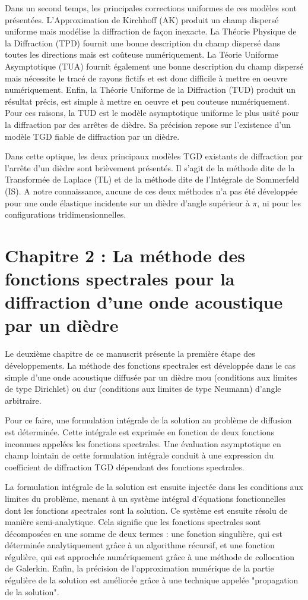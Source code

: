 Dans un second temps, les principales corrections uniformes de ces modèles sont présentées. L'Approximation de Kirchhoff (AK) produit un champ dispersé uniforme mais modélise la diffraction de façon inexacte. La Théorie Physique de la Diffraction (TPD) fournit une bonne description du champ dispersé dans toutes les directions mais est coûteuse numériquement. La Téorie Uniforme Asymptotique (TUA) fournit également une bonne description du champ dispersé mais nécessite le tracé de rayons fictifs et est donc difficile à mettre en oeuvre numériquement. Enfin, la Théorie Uniforme de la Diffraction (TUD) produit un résultat précis, est simple à mettre en oeuvre et peu couteuse numériquement. Pour ces raisons, la TUD est le modèle asymptotique uniforme le plus usité pour la diffraction par des arrêtes de dièdre. Sa précision repose sur l'existence d'un modèle TGD fiable de diffraction par un dièdre. 

Dans cette optique, les deux principaux modèles TGD existants de diffraction par l'arrête d'un dièdre sont brièvement présentés. Il s'agit de la méthode dite de la Transformée de Laplace (TL) et de la méthode dite de l'Intégrale de Sommerfeld (IS). A notre connaissance, aucune de ces deux méthodes n'a pas été développée pour une onde élastique incidente sur un dièdre d'angle supérieur à $\pi$, ni pour les configurations tridimensionnelles.

\section[Résumé du chapitre 2]{Chapitre 2 : La méthode des fonctions spectrales pour la diffraction d'une onde acoustique par un dièdre}

Le deuxième chapitre de ce manuscrit présente la première étape des développements. La méthode des fonctions spectrales est développée dans le cas simple d'une onde acoustique diffusée par un dièdre mou (conditions aux limites de type Dirichlet) ou dur (conditions aux limites de type Neumann) d'angle arbitraire. 

Pour ce faire, une formulation intégrale de la solution au problème de diffusion est déterminée. Cette intégrale est exprimée en fonction de deux fonctions inconnues appelées les fonctions spectrales. Une évaluation asymptotique en champ lointain de cette formulation intégrale conduit à une expression du coefficient de diffraction TGD dépendant des fonctions spectrales.

La formulation intégrale de la solution est ensuite injectée dans les conditions aux limites du problème, menant à un système intégral d'équations fonctionnelles dont les fonctions spectrales sont la solution. Ce système est ensuite résolu de manière semi-analytique. Cela signifie que les fonctions spectrales sont décomposées en une somme de deux termes : une fonction singulière, qui est déterminée analytiquement grâce à un algorithme récursif, et une fonction régulière, qui est approchée numériquement grâce à une méthode de collocation de Galerkin. Enfin, la précision de l'approximation numérique de la partie régulière de la solution est améliorée grâce à une technique appelée "propagation de la solution".


